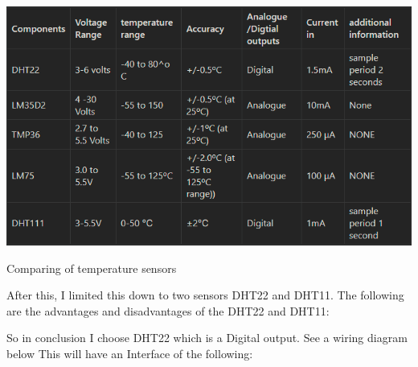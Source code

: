\begin{table}[h!]
	\centering
	\includegraphics[width=0.5\linewidth]{Images/tempssenorscompared.png}
	\caption{Comparing of temperature sensors}
	\label{Comparing of temperature sensors}
\end{table}
After this, I limited this down to two sensors DHT22 and DHT11. The  following are the advantages and disadvantages of the DHT22 and DHT11:
\begin{table}[h!]
	\centering
	\caption{Comparing DHT22 and DHT11}
	\label{Compareing DHT22 and DHT11}

\end{table}
So in conclusion I choose DHT22 which is a  Digital output. See a wiring diagram below
\newpage
This will have an Interface of the following:

